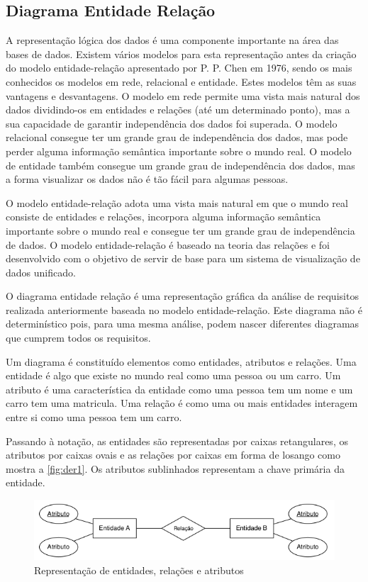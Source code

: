 \documentclass[11pt,twoside,a4paper]{report}
\begin{document}
\subsection{Diagrama Entidade Relação}
\label{subchap:DER}
A representação lógica dos dados é uma componente importante na área das bases de dados. Existem vários modelos para esta representação antes da criação do modelo entidade-relação apresentado por P. P. Chen em 1976, sendo os mais conhecidos os modelos em rede, relacional e entidade. Estes modelos têm as suas vantagens e desvantagens. O modelo em rede permite uma vista mais natural dos dados dividindo-os em entidades e relações (até um determinado ponto), mas a sua capacidade de garantir independência dos dados foi superada. O modelo relacional consegue ter um grande grau de independência dos dados, mas pode perder alguma informação semântica importante sobre o mundo real. O modelo de entidade também consegue um grande grau de independência dos dados, mas a forma visualizar os dados não é tão fácil para algumas pessoas\cite{Chen}.\par
O modelo entidade-relação adota uma vista mais natural em que o mundo real consiste de entidades e relações, incorpora alguma informação semântica importante sobre o mundo real e consegue ter um grande grau de independência de dados. O modelo entidade-relação é baseado na teoria das relações e foi desenvolvido com o objetivo de servir de base para um sistema de visualização de dados unificado\cite{Chen}.\par
O diagrama entidade relação é uma representação gráfica da análise de requisitos realizada anteriormente baseada no modelo entidade-relação. Este diagrama não é determinístico pois, para uma mesma análise, podem nascer diferentes diagramas que cumprem todos os requisitos.\par
Um diagrama é constituído elementos como entidades, atributos e relações. Uma entidade é algo que existe no mundo real como uma pessoa ou um carro. Um atributo é uma característica da entidade como uma pessoa tem um nome e um carro tem uma matricula. Uma relação é como uma ou mais entidades interagem entre si como uma pessoa tem um carro\cite{Chen}.\par 
Passando à notação, as entidades são representadas por caixas retangulares, os atributos por caixas ovais e as relações por caixas em forma de losango como mostra a \autoref{fig:der1}. Os atributos sublinhados representam a chave primária da entidade.
\begin{figure}[H]
	\begin{center}
		\includegraphics[width=1\textwidth]{notacao1} %
		\caption{Representação de entidades, relações e atributos}
		\label{fig:der1}
	\end{center}
\end{figure}
\end{document}
